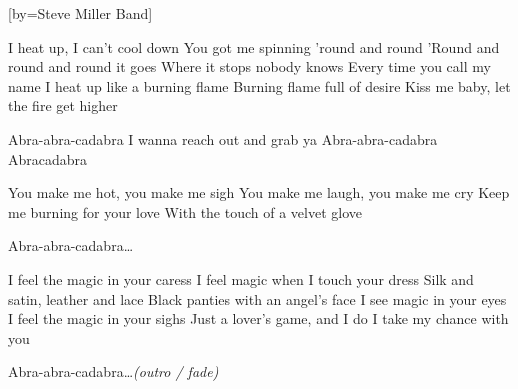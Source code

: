 


[by=Steve Miller Band]

\beginverse*
{\nolyrics Jam chart: \[Am] \[G] \[F] \[E] \quad (Loop)}
\endverse

\beginverse
I heat up, I can't cool down \brk  You got me spinning 'round and round
'Round and round and round it goes \brk  Where it stops nobody knows
Every time you call my name \brk  I heat up like a burning flame
Burning flame full of desire \brk  Kiss me baby, let the fire get higher
\endverse

\beginchorus
Abra-abra-cadabra \brk  I wanna reach out and grab ya
Abra-abra-cadabra \brk  Abracadabra
\endchorus

\beginverse
You make me hot, you make me sigh \brk  You make me laugh, you make me cry
Keep me burning for your love \brk  With the touch of a velvet glove
\endverse

\beginchorus
{} Abra-abra-cadabra\ldots
\endchorus

\beginverse
I feel the magic in your caress \brk  I feel magic when I touch your dress
Silk and satin, leather and lace \brk  Black panties with an angel's face
I see magic in your eyes \brk  I feel the magic in your sighs
Just a lover's game, and I do \brk  I take my chance with you
\endverse

\beginchorus
{} Abra-abra-cadabra\ldots \emph{(outro / fade)}
\endchorus

\endsong

